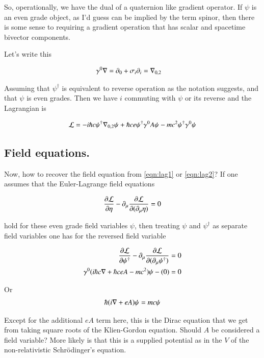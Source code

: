 \documentclass{article}
\begin{document}
So, operationally, we have the dual of a quaternion like gradient operator.  If $\psi$ is an even grade object, as I'd guess can be implied by
the term spinor, then there is some sense to requiring a gradient operation that has scalar and spacetime bivector components.

Let's write this

\begin{align*}
\gamma^0 \nabla &= \partial_0 + \sigma_i \partial_i = {\nabla}_{0,2}
\end{align*}

Assuming that $\psi^\dagger$ is equivalent to reverse operation as the notation suggests, and that $\psi$ is even grades.  Then we have $i$ commuting with $\psi$ or its reverse and the Lagrangian is

\begin{align}\label{eqn:lag2}
\mathcal{L} 
= 
-i \hbar c \psi^\dagger {\nabla}_{0,2} \psi
+ \hbar c e \psi^\dagger \gamma^0 A \psi
- m c^2 \psi^\dagger \gamma^0 \psi
\end{align}

\subsection{ Field equations. }

Now, how to recover the field equation from \ref{eqn:lag1} or \ref{eqn:lag2}?  If one assumes that the Euler-Lagrange field equations

\begin{align*}
\frac{\partial {\mathcal{L}}}{\partial {\eta}} - \partial_\mu \frac{\partial {\mathcal{L}}}{\partial {(\partial_\mu \eta)}} = 0
\end{align*}

hold for these even grade field variables $\psi$, then treating $\psi$ and $\psi^\dagger$ as separate field variables one has for the reversed field variable

\begin{align*}
\frac{\partial {\mathcal{L}}}{\partial {\psi^\dagger}} - \partial_\mu \frac{\partial {\mathcal{L}}}{\partial {(\partial_\mu \psi^\dagger)}} &= 0 \\
\gamma^0 ( i \hbar c \nabla + \hbar c e A - mc^2) \psi - (0) &= 0
\end{align*}

Or 
\begin{align*}
\hbar (i \nabla + e A) \psi = mc \psi
\end{align*}

Except for the additional $e A$ term here, this is the Dirac equation that we get from taking square roots of the Klien-Gordon equation.  Should $A$ be considered a field variable?  More likely is that this is a supplied potential as in the $V$ of the non-relativistic 
Schr\"{o}dinger's equation.
\end{document}
